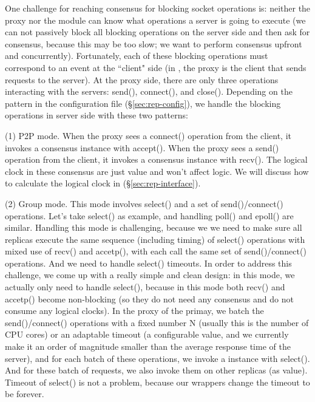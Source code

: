 One challenge for reaching consensus for blocking socket operations is: neither the proxy nor 
the \smt module can know what operations a server is going to execute (we can 
not passively block all blocking operations on the server side and then ask for 
consensus, because this may be too slow; we want to perform consensus upfront 
and concurrently). Fortunately, each of these blocking operations must 
correspond to an event at the ``client" side (in \msmr, the proxy is the client 
that sends requests to the server). At the proxy side, there are only three 
operations interacting with the servers: send(), connect(), and close(). 
Depending on the pattern in the configuration file (\S\ref{sec:rep-config}), we 
handle the blocking operations in server side with these two patterns:

(1) P2P mode. When the proxy sees a connect() operation from the client, it invokes a 
consensus instance with accept(). When the proxy sees a send() operation from the client, it 
invokes a consensus instance with recv(). The logical clock in these consensus 
are just value and won't affect \paxos logic. We will discuss how to calculate 
the logical clock in (\S\ref{sec:rep-interface}).

(2) Group mode. This mode involves select() and a set of send()/connect() 
operations. Let's take select() as example, and handling poll() and epoll() are 
similar. Handling this mode is challenging, because we we need to make sure 
all replicas execute the same sequence (including timing) of 
select() operations with mixed use of recv() and accetp(), with each call 
the same set of send()/connect() operations. And we need to handle select() 
timeouts. In order to address this challenge, we come up with a really simple 
and clean design: in this mode, we actually only need to handle select(), 
because in this mode both recv() and accetp() become non-blocking (so they do 
not need any consensus and do not consume any logical clocks). In the 
proxy of the primay, we batch the send()/connect() operations with a fixed 
number N (usually this is the number of CPU cores) or an adaptable timeout (a 
configurable value, and we currently make it an order of magnitude smaller than the 
average response time of the server), and for each batch of these operations, 
we invoke a \paxos instance with select(). And for these batch of requests, we 
also invoke them on other replicas (as \paxos value). Timeout of select() is 
not a problem, because our \smt wrappers change the timeout to be forever.

